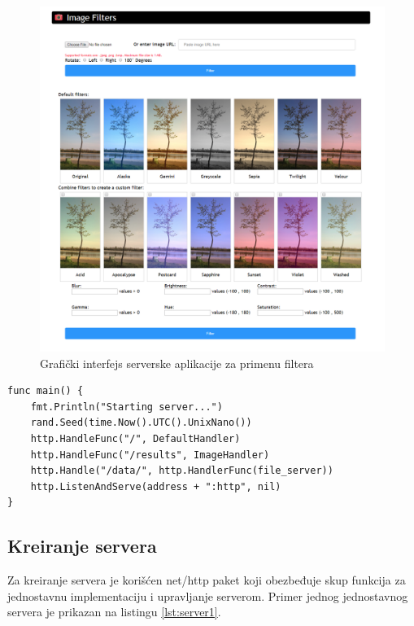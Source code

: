 \documentclass[12pt,oneside]{memoir}
\begin{document}
\begin{figure}
\begin{center}
\includegraphics[scale=0.33]{interface.png}
\end{center}
\caption{Grafički interfejs serverske aplikacije za primenu filtera}
\label{fig:interface}
\end{figure}

\begin{center}
\begin{lstlisting}[caption={Main funkcija, kreiranje servera},label={lst:main}, float, backgroundcolor=\color{background},belowskip=-0.8 \baselineskip]
func main() {
	fmt.Println("Starting server...")
	rand.Seed(time.Now().UTC().UnixNano())
	http.HandleFunc("/", DefaultHandler)
	http.HandleFunc("/results", ImageHandler)
	http.Handle("/data/", http.HandlerFunc(file_server))
	http.ListenAndServe(address + ":http", nil)
}
\end{lstlisting}
\end{center}

\subsection{Kreiranje servera}

Za kreiranje servera je korišćen net/http paket koji obezbeđuje skup funkcija za jednostavnu implementaciju i upravljanje serverom. Primer jednog jednostavnog servera je prikazan na listingu \ref{lst:server1}. 
\end{document}
